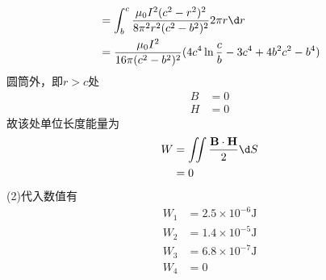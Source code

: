 \documentclass{phyasgn}
\begin{document}
\begin{sol}[4-68]
$$\begin{aligned}
        &=\int_b^c\frac{\mu_0I^2(c^2-r^2)^2}{8\pi^2r^2(c^2-b^2)^2}2\pi r\d r\\
        &=\frac{\mu_0I^2}{16\pi(c^2-b^2)^2}(4c^4\ln\frac{c}{b}-3c^4+4b^2c^2-b^4)
       \end{aligned}$$
       圆筒外，即$r>c$处
       $$\begin{aligned}
        B&=0\\
        H&=0
       \end{aligned}$$
       故该处单位长度能量为
       $$\begin{aligned}
        W&=\iint\frac{\mathbf{B}\cdot \mathbf{H}}{2}\d S\\
        &=0
       \end{aligned}$$
       (2)代入数值有
       $$\begin{aligned}
        W_1&=2.5\times10^{-6}\text{J}\\
        W_2&=1.4\times10^{-5}\text{J}\\
        W_3&=6.8\times10^{-7}\text{J}\\
        W_4&=0 
       \end{aligned}$$
       
\end{sol}\par
\end{document}
